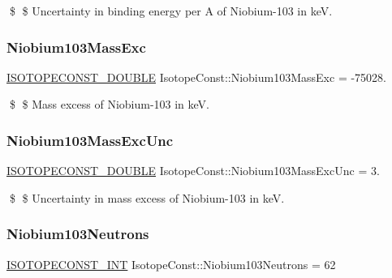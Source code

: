 \$ \$ Uncertainty in binding energy per A of Niobium-\/103 in keV. \mbox{\label{group___isotope_const-_niobium-_nb103_gae0a60f256a0d0b47ef552bb4cffe0491}} 
\subsubsection{\texorpdfstring{Niobium103\+Mass\+Exc}{Niobium103MassExc}}
{\footnotesize\ttfamily \mbox{\hyperlink{group___isotope_const-_macros_ga8f45a7272ce02c0b4c65c44636ed719a}{I\+S\+O\+T\+O\+P\+E\+C\+O\+N\+S\+T\+\_\+\+D\+O\+U\+B\+LE}} Isotope\+Const\+::\+Niobium103\+Mass\+Exc = -\/75028.}

\$ \$ Mass excess of Niobium-\/103 in keV. \mbox{\label{group___isotope_const-_niobium-_nb103_gaaf190ded85e30efb7081c2bd020b00fe}} 
\subsubsection{\texorpdfstring{Niobium103\+Mass\+Exc\+Unc}{Niobium103MassExcUnc}}
{\footnotesize\ttfamily \mbox{\hyperlink{group___isotope_const-_macros_ga8f45a7272ce02c0b4c65c44636ed719a}{I\+S\+O\+T\+O\+P\+E\+C\+O\+N\+S\+T\+\_\+\+D\+O\+U\+B\+LE}} Isotope\+Const\+::\+Niobium103\+Mass\+Exc\+Unc = 3.}

\$ \$ Uncertainty in mass excess of Niobium-\/103 in keV. \mbox{\label{group___isotope_const-_niobium-_nb103_ga647f6bbcd8dc4cbeca6daa3cd6c3de0b}} 
\subsubsection{\texorpdfstring{Niobium103\+Neutrons}{Niobium103Neutrons}}
{\footnotesize\ttfamily \mbox{\hyperlink{group___isotope_const-_macros_ga5f18360b3e99483a35c32d789e62621c}{I\+S\+O\+T\+O\+P\+E\+C\+O\+N\+S\+T\+\_\+\+I\+NT}} Isotope\+Const\+::\+Niobium103\+Neutrons = 62}

